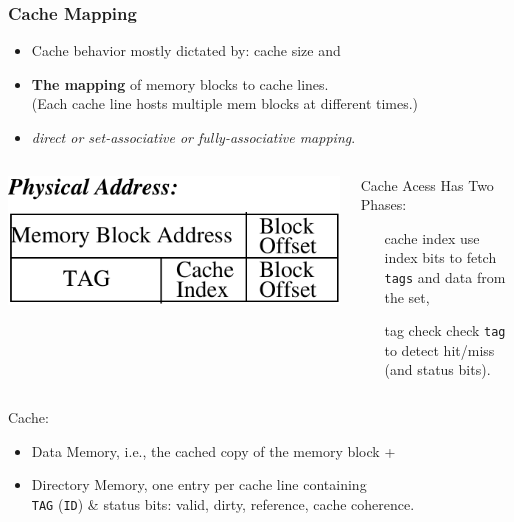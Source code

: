 \documentclass{beamer}
\renewcommand{\emph}[1]{\textcolor{structure}{#1}}
\newcommand{\emp}[1]{\textcolor{DikuRed}{ #1}}
\begin{document}
\begin{frame}[fragile,t]
\frametitle{Cache Mapping}
 
\begin{itemize}
    \item Cache behavior mostly dictated by: cache size and
    \item {\bf The mapping} of \emp{memory blocks} to \emph{cache lines}.\\
            (Each cache line hosts multiple mem blocks at different times.)
    \item {\em direct or set-associative or fully-associative mapping}.\smallskip
\end{itemize}
\begin{columns}
\includegraphics[width=25ex]{FigsMemH/CacheMapping}
\begin{scriptsize}
Cache Acess Has Two Phases:
\begin{itemize}
    \item[cache index] use index bits to fetch {\tt tags} and data from the set,
    \item[tag check] check {\tt tag} to detect hit/miss (and status bits).
\end{itemize} 
\end  {scriptsize}
\end{columns}

\bigskip
Cache:
\begin{itemize}
    \item \emph{Data Memory}, i.e., the cached copy of the memory block + 
    \item \emp{Directory Memory}, one entry per cache line containing\\ 
            {\tt TAG} ({\tt ID}) \& status bits: valid, dirty, reference, cache coherence.\\\smallskip
\end  {itemize}

\end{frame}
\end{document}
